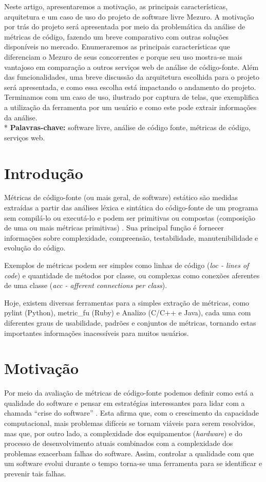 \documentclass[12pt]{article}
\begin{document}
\begin{resumo}
  Neste artigo, apresentaremos a motivação, as principais características, arquitetura e um caso de uso do projeto de software livre Mezuro.
  A motivação por trás do projeto será apresentada por meio da problemática da análise de métricas de código, fazendo um breve
  comparativo com outras soluções disponíveis no mercado. Enumeraremos as principais características que diferenciam
  o Mezuro de seus concorrentes e porque seu uso mostra-se mais vantajoso em comparação a outros serviços web de análise de código-fonte.
  Além das funcionalidades, uma breve discussão da arquitetura escolhida para o projeto
  será apresentada, e como essa escolha está impactando o andamento do projeto. Terminamos com um caso de uso, ilustrado por captura de telas, que exemplifica
  a utilização da ferramenta por um usuário e como este pode extrair informações da análise.
  \\*
  \textbf{Palavras-chave:} software livre, análise de código fonte, métricas de código, serviços web.
\end{resumo}

\newpage

\section{Introdução} \label{sec:intro}
Métricas de código-fonte (ou mais geral, de software) estático são medidas extraídas a partir das análises léxica e sintática do código-fonte de um programa sem compilá-lo ou executá-lo e podem ser primitivas ou compostas (composição de uma ou mais métricas primitivas) \cite{m13}. Sua principal função é fornecer informações sobre complexidade, compreensão, testabilidade, manutenibilidade e evolução do código\cite{m13}.

Exemplos de métricas podem ser simples como linhas de código (\textit{loc - lines of code}) e quantidade de métodos por classe, ou complexas como conexões aferentes de uma classe (\textit{acc - afferent connections per class}).

Hoje, existem diversas ferramentas para a simples extração de métricas, como pylint (Python), metric\_fu (Ruby) e Analizo (C/C++ e Java), cada uma com diferentes graus de usabilidade, padrões e conjuntos de métricas, tornando estas importantes informações inacessíveis para muitos usuários.

\section{Motivação}
Por meio da avaliação de métricas de código-fonte podemos definir como está a qualidade do software e pensar em estratégias interessantes para lidar com a chamada ``crise do software'' \cite{nr68}. Esta afirma que, com o crescimento da capacidade computacional, mais problemas difíceis se tornam viáveis para serem resolvidos, mas que, por outro lado, a complexidade dos equipamentos (\textit{hardware}) e do processo de desenvolvimento atuais combinados com a complexidade dos problemas exacerbam falhas do software. Assim, controlar a qualidade com que um software evolui durante o tempo torna-se uma ferramenta para se identificar e prevenir tais falhas.
\end{document}
